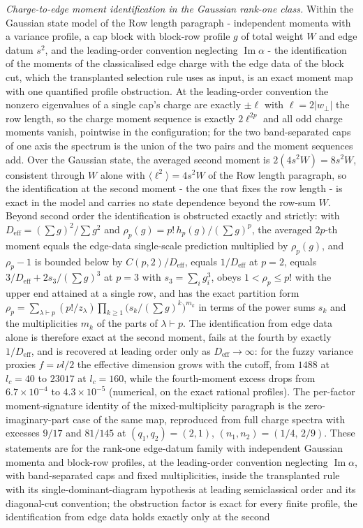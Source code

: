 \emph{Charge-to-edge moment identification in the Gaussian rank-one class.} Within the Gaussian state model of the Row length paragraph - independent momenta with a variance profile, a cap block with block-row profile \(g\) of total weight \(W\) and edge datum \(s^{2}\), and the leading-order convention neglecting \(\operatorname{Im}\alpha\) - the identification of the moments of the classicalised edge charge with the edge data of the block cut, which the transplanted selection rule uses as input, is an exact moment map with one quantified profile obstruction. At the leading-order convention the nonzero eigenvalues of a single cap's charge are exactly \(\pm\ell\) with \(\ell=2|w_\perp|\) the row length, so the charge moment sequence is exactly \(2\ell^{2p}\) and all odd charge moments vanish, pointwise in the configuration; for the two band-separated caps of one axis the spectrum is the union of the two pairs and the moment sequences add. Over the Gaussian state, the averaged second moment is \(2(4s^{2}W)=8s^{2}W\), consistent through \(W\) alone with \(\langle\ell^{2}\rangle=4s^{2}W\) of the Row length paragraph, so the identification at the second moment - the one that fixes the row length - is exact in the model and carries no state dependence beyond the row-sum \(W\). Beyond second order the identification is obstructed exactly and strictly: with \(D_{\mathrm{eff}}=(\sum g)^{2}/\sum g^{2}\) and \(\rho_{p}(g)=p!\,h_{p}(g)/(\sum g)^{p}\), the averaged \(2p\)-th moment equals the edge-data single-scale prediction multiplied by \(\rho_{p}(g)\), and \(\rho_{p}-1\) is bounded below by \(C(p,2)/D_{\mathrm{eff}}\), equals \(1/D_{\mathrm{eff}}\) at \(p=2\), equals \(3/D_{\mathrm{eff}}+2s_{3}/(\sum g)^{3}\) at \(p=3\) with \(s_{3}=\sum_i g_i^{3}\), obeys \(1<\rho_{p}\le p!\) with the upper end attained at a single row, and has the exact partition form \(\rho_{p}=\sum_{\lambda\vdash p}(p!/z_{\lambda})\prod_{k\ge1}\bigl(s_{k}/(\sum g)^{k}\bigr)^{m_{k}}\) in terms of the power sums \(s_{k}\) and the multiplicities \(m_{k}\) of the parts of \(\lambda\vdash p\). The identification from edge data alone is therefore exact at the second moment, fails at the fourth by exactly \(1/D_{\mathrm{eff}}\), and is recovered at leading order only as \(D_{\mathrm{eff}}\to\infty\): for the fuzzy variance proxies \(f=\nu l/2\) the effective dimension grows with the cutoff, from \(1488\) at \(l_c=40\) to \(23017\) at \(l_c=160\), while the fourth-moment excess drops from \(6.7\times10^{-4}\) to \(4.3\times10^{-5}\) (numerical, on the exact rational profiles). The per-factor moment-signature identity of the mixed-multiplicity paragraph is the zero-imaginary-part case of the same map, reproduced from full charge spectra with excesses \(9/17\) and \(81/145\) at \((q_{1},q_{2})=(2,1)\), \((n_{1},n_{2})=(1/4,\,2/9)\). These statements are for the rank-one edge-datum family with independent Gaussian momenta and block-row profiles, at the leading-order convention neglecting \(\operatorname{Im}\alpha\), with band-separated caps and fixed multiplicities, inside the transplanted rule with its single-dominant-diagram hypothesis at leading semiclassical order and its diagonal-cut convention; the obstruction factor is exact for every finite profile, the identification from edge data holds exactly only at the second 